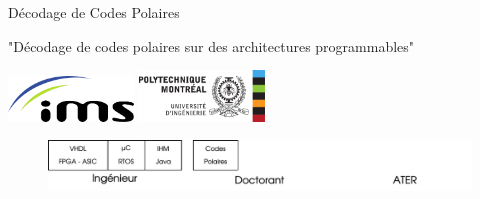 \documentclass[t,compress,mathserif,12pt,xcolor=dvipsnames]{beamer}
\begin{document}
\begin{frame}[t]{Décodage de Codes Polaires}
  \begin{minipage}[t][5.0cm][t]{\textwidth}
  \vspace{1cm}
  \centering
  "Décodage de codes polaires sur des architectures programmables"
  \vspace{1cm}

        \includegraphics[width=0.25\textwidth]{logos/ims}\hspace{2cm}
        \includegraphics[width=0.25\textwidth]{logos/poly2}
  \end{minipage}
  \begin{figure}[htp]
    \centering
    \includegraphics[width=\textwidth]{fig/frise5}
  \end{figure}
\end{frame}
\end{document}

